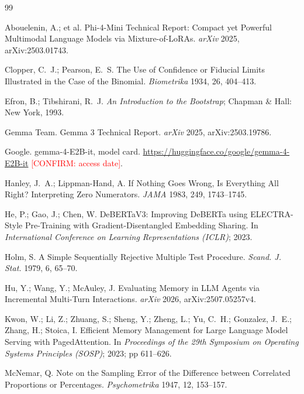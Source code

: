 \documentclass[11pt]{article}
\newcommand{\confirm}[1]{\textcolor{red}{[CONFIRM: #1]}} %
\begin{document}
\begin{thebibliography}{99}

 Abouelenin, A.; et al. Phi-4-Mini Technical Report: Compact yet Powerful Multimodal Language Models via Mixture-of-LoRAs. \emph{arXiv} 2025, arXiv:2503.01743.

 Clopper, C.~J.; Pearson, E.~S. The Use of Confidence or Fiducial Limits Illustrated in the Case of the Binomial. \emph{Biometrika} 1934, 26, 404--413.

 Efron, B.; Tibshirani, R.~J. \emph{An Introduction to the Bootstrap}; Chapman \& Hall: New York, 1993.

 Gemma Team. Gemma 3 Technical Report. \emph{arXiv} 2025, arXiv:2503.19786.

 Google. gemma-4-E2B-it, model card. \url{https://huggingface.co/google/gemma-4-E2B-it} \confirm{access date}.

 Hanley, J.~A.; Lippman-Hand, A. If Nothing Goes Wrong, Is Everything All Right? Interpreting Zero Numerators. \emph{JAMA} 1983, 249, 1743--1745.

 He, P.; Gao, J.; Chen, W. DeBERTaV3: Improving DeBERTa using ELECTRA-Style Pre-Training with Gradient-Disentangled Embedding Sharing. In \emph{International Conference on Learning Representations (ICLR)}; 2023.

 Holm, S. A Simple Sequentially Rejective Multiple Test Procedure. \emph{Scand. J. Stat.} 1979, 6, 65--70.

 Hu, Y.; Wang, Y.; McAuley, J. Evaluating Memory in LLM Agents via Incremental Multi-Turn Interactions. \emph{arXiv} 2026, arXiv:2507.05257v4.

 Kwon, W.; Li, Z.; Zhuang, S.; Sheng, Y.; Zheng, L.; Yu, C.~H.; Gonzalez, J.~E.; Zhang, H.; Stoica, I. Efficient Memory Management for Large Language Model Serving with PagedAttention. In \emph{Proceedings of the 29th Symposium on Operating Systems Principles (SOSP)}; 2023; pp 611--626.

 McNemar, Q. Note on the Sampling Error of the Difference between Correlated Proportions or Percentages. \emph{Psychometrika} 1947, 12, 153--157.


\end{thebibliography}
\end{document}
